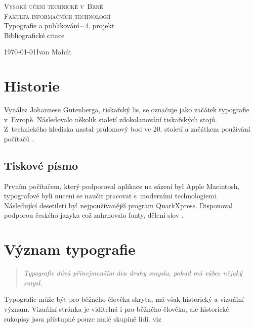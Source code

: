 \documentclass[a4paper, 11pt]{article}
\begin{document}

\begin{titlepage}
    \begin{center}
        \Huge\textsc{Vysoké učení technické v~Brně}\\
        \huge\textsc{Fakulta informačních technologií}\\
        \LARGE Typografie a publikování\,--\,4. projekt\\ 
        \Huge Bibliografické citace\\
    \end{center}
    {\Large \today \hfill Ivan Mahút}
\end{titlepage}

\pagebreak
\setcounter{page}{1}

\section{Historie}
Vynález Johannese Gutenberga, tiskařský lis, se označuje jako začátek typografie v~Evropě. Následovalo několik staletí zdokolanování tiskařských stojů. 
Z~technického hlediska nastal průlomový bod ve 20. století a začátkem používání počítačů \cite{jirasek}.

\subsection{Tiskové písmo}
Prvním počítačem, který podporoval aplikace na sázení byl Apple Macintosh, typografové byli nuceni se naučit pracovat s~moderními technologiemi. Následující desetiletí byl nejpoužívanější program QuarkXpress.
Disponoval podporou českého jazyka což zahrnovalo fonty, dělení slov \cite{vasilova}.

\section{Význam typografie}
\begin{quotation}
\textit{Typografie dává přinejmenším dva druhy smyslu, pokud má vůbec nějaký smysl.}
\end{quotation}
Typografie může být pro běžného člověka skryta, má však historický a vizuální význam. Vizuální stránka je viditelná i pro běžného člověka, ale historické rukopisy jsou přístupné pouze malé skupině lidí. viz \cite{bringhurst}
\end{document}
